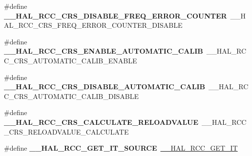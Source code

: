 \begin{DoxyCompactItemize}
\item 
\hypertarget{group___h_a_l___r_c_c___aliased_ga4fde79e50cae4f2d38db5c547037b84b}{\#define {\bfseries \-\_\-\-\_\-\-H\-A\-L\-\_\-\-R\-C\-C\-\_\-\-C\-R\-S\-\_\-\-D\-I\-S\-A\-B\-L\-E\-\_\-\-F\-R\-E\-Q\-\_\-\-E\-R\-R\-O\-R\-\_\-\-C\-O\-U\-N\-T\-E\-R}~\-\_\-\-\_\-\-H\-A\-L\-\_\-\-R\-C\-C\-\_\-\-C\-R\-S\-\_\-\-F\-R\-E\-Q\-\_\-\-E\-R\-R\-O\-R\-\_\-\-C\-O\-U\-N\-T\-E\-R\-\_\-\-D\-I\-S\-A\-B\-L\-E}\label{group___h_a_l___r_c_c___aliased_ga4fde79e50cae4f2d38db5c547037b84b}

\item 
\hypertarget{group___h_a_l___r_c_c___aliased_ga5995b6b81fd33e5ea35834afb5869f1e}{\#define {\bfseries \-\_\-\-\_\-\-H\-A\-L\-\_\-\-R\-C\-C\-\_\-\-C\-R\-S\-\_\-\-E\-N\-A\-B\-L\-E\-\_\-\-A\-U\-T\-O\-M\-A\-T\-I\-C\-\_\-\-C\-A\-L\-I\-B}~\-\_\-\-\_\-\-H\-A\-L\-\_\-\-R\-C\-C\-\_\-\-C\-R\-S\-\_\-\-A\-U\-T\-O\-M\-A\-T\-I\-C\-\_\-\-C\-A\-L\-I\-B\-\_\-\-E\-N\-A\-B\-L\-E}\label{group___h_a_l___r_c_c___aliased_ga5995b6b81fd33e5ea35834afb5869f1e}

\item 
\hypertarget{group___h_a_l___r_c_c___aliased_ga1a09d18c05bd1f6fbbd78ffaecc3d96f}{\#define {\bfseries \-\_\-\-\_\-\-H\-A\-L\-\_\-\-R\-C\-C\-\_\-\-C\-R\-S\-\_\-\-D\-I\-S\-A\-B\-L\-E\-\_\-\-A\-U\-T\-O\-M\-A\-T\-I\-C\-\_\-\-C\-A\-L\-I\-B}~\-\_\-\-\_\-\-H\-A\-L\-\_\-\-R\-C\-C\-\_\-\-C\-R\-S\-\_\-\-A\-U\-T\-O\-M\-A\-T\-I\-C\-\_\-\-C\-A\-L\-I\-B\-\_\-\-D\-I\-S\-A\-B\-L\-E}\label{group___h_a_l___r_c_c___aliased_ga1a09d18c05bd1f6fbbd78ffaecc3d96f}

\item 
\hypertarget{group___h_a_l___r_c_c___aliased_ga116f9acbd5f6b61002ea1a6d3b17fdcd}{\#define {\bfseries \-\_\-\-\_\-\-H\-A\-L\-\_\-\-R\-C\-C\-\_\-\-C\-R\-S\-\_\-\-C\-A\-L\-C\-U\-L\-A\-T\-E\-\_\-\-R\-E\-L\-O\-A\-D\-V\-A\-L\-U\-E}~\-\_\-\-\_\-\-H\-A\-L\-\_\-\-R\-C\-C\-\_\-\-C\-R\-S\-\_\-\-R\-E\-L\-O\-A\-D\-V\-A\-L\-U\-E\-\_\-\-C\-A\-L\-C\-U\-L\-A\-T\-E}\label{group___h_a_l___r_c_c___aliased_ga116f9acbd5f6b61002ea1a6d3b17fdcd}

\item 
\hypertarget{group___h_a_l___r_c_c___aliased_gabfda03424b7b180eec4bad4bf9c76799}{\#define {\bfseries \-\_\-\-\_\-\-H\-A\-L\-\_\-\-R\-C\-C\-\_\-\-G\-E\-T\-\_\-\-I\-T\-\_\-\-S\-O\-U\-R\-C\-E}~\hyperlink{group___r_c_c___flags___interrupts___management_ga134af980b892f362c05ae21922cd828d}{\-\_\-\-\_\-\-H\-A\-L\-\_\-\-R\-C\-C\-\_\-\-G\-E\-T\-\_\-\-I\-T}}\label{group___h_a_l___r_c_c___aliased_gabfda03424b7b180eec4bad4bf9c76799}


\end{DoxyCompactItemize}
